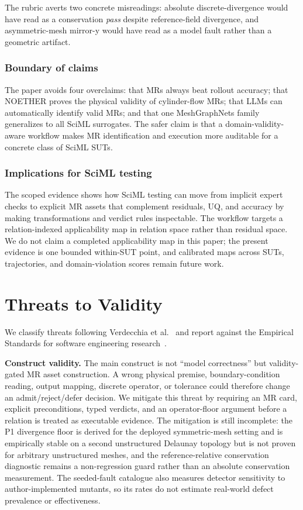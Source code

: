 \documentclass[preprint,12pt]{elsarticle}
\begin{document}
The rubric averts two concrete misreadings: absolute discrete-divergence would have read as a conservation \emph{pass} despite reference-field divergence, and asymmetric-mesh mirror-y would have read as a model fault rather than a geometric artifact.

\subsubsection{Boundary of claims}
\label{subsec:boundary-claims}

The paper avoids four overclaims: that MRs always beat rollout accuracy; that NOETHER proves the physical validity of cylinder-flow MRs; that LLMs can automatically identify valid MRs; and that one MeshGraphNets family generalizes to all SciML surrogates. The safer claim is that a domain-validity-aware workflow makes MR identification and execution more auditable for a concrete class of SciML SUTs.

\subsubsection{Implications for SciML testing}
\label{subsec:implications}

The scoped evidence shows how SciML testing can move from implicit expert checks to explicit MR assets that complement residuals, UQ, and accuracy by making transformations and verdict rules inspectable. The workflow targets a relation-indexed applicability map in relation space rather than residual space. We do not claim a completed applicability map in this paper; the present evidence is one bounded within-SUT point, and calibrated maps across SUTs, trajectories, and domain-violation scores remain future work.

\section{Threats to Validity}
\label{sec:threats}

We classify threats following Verdecchia et al.~\citep{verdecchia2023threats} and report against the Empirical Standards for software engineering research~\citep{ralph2021empirical}.

\textbf{Construct validity.} The main construct is not ``model correctness'' but validity-gated MR asset construction. A wrong physical premise, boundary-condition reading, output mapping, discrete operator, or tolerance could therefore change an admit/reject/defer decision. We mitigate this threat by requiring an MR card, explicit preconditions, typed verdicts, and an operator-floor argument before a relation is treated as executable evidence. The mitigation is still incomplete: the P1 divergence floor is derived for the deployed symmetric-mesh setting and is empirically stable on a second unstructured Delaunay topology but is not proven for arbitrary unstructured meshes, and the reference-relative conservation diagnostic remains a non-regression guard rather than an absolute conservation measurement. The seeded-fault catalogue also measures detector sensitivity to author-implemented mutants, so its rates do not estimate real-world defect prevalence or effectiveness.
\end{document}
